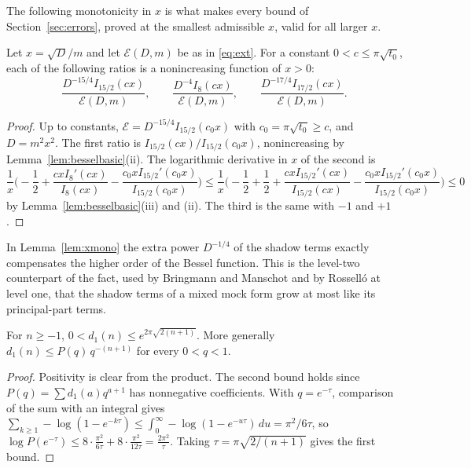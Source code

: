 The following monotonicity in $x$ is what makes every bound of Section~\ref{sec:errors}, proved at the smallest admissible $x$, valid for all larger $x$.

\begin{lemma}\label{lem:xmono}
Let $x=\sqrt D/m$ and let $\mathcal E(D,m)$ be as in \eqref{eq:ext}. For a constant $0<c\le\pi\sqrt{t_0}$, each of the following ratios is a nonincreasing function of $x>0$:
\[
\frac{D^{-15/4}I_{15/2}(cx)}{\mathcal E(D,m)},\qquad\frac{D^{-4}I_8(cx)}{\mathcal E(D,m)},\qquad\frac{D^{-17/4}I_{17/2}(cx)}{\mathcal E(D,m)}.
\]
\end{lemma}

\begin{proof}
Up to constants, $\mathcal E=D^{-15/4}I_{15/2}(c_0x)$ with $c_0=\pi\sqrt{t_0}\ge c$, and $D=m^2x^2$. The first ratio is $I_{15/2}(cx)/I_{15/2}(c_0x)$, nonincreasing by Lemma~\ref{lem:besselbasic}(ii). The logarithmic derivative in $x$ of the second is
\[
\frac1x\Big(-\frac12+\frac{cxI_8'(cx)}{I_8(cx)}-\frac{c_0xI_{15/2}'(c_0x)}{I_{15/2}(c_0x)}\Big)\le\frac1x\Big(-\frac12+\frac12+\frac{cxI_{15/2}'(cx)}{I_{15/2}(cx)}-\frac{c_0xI_{15/2}'(c_0x)}{I_{15/2}(c_0x)}\Big)\le0
\]
by Lemma~\ref{lem:besselbasic}(iii) and (ii). The third is the same with $-1$ and $+1$.
\end{proof}

\begin{remark}
In Lemma~\ref{lem:xmono} the extra power $D^{-1/4}$ of the shadow terms exactly compensates the higher order of the Bessel function. This is the level-two counterpart of the fact, used by Bringmann and Manschot \cite{BMa13} and by Rossell\'o at level one, that the shadow terms of a mixed mock form grow at most like its principal-part terms.
\end{remark}

\begin{lemma}\label{lem:d1bound}
For $n\ge-1$, $0<d_1(n)\le e^{2\pi\sqrt{2(n+1)}}$. More generally $d_1(n)\le P(q)\,q^{-(n+1)}$ for every $0<q<1$.
\end{lemma}

\begin{proof}
Positivity is clear from the product. The second bound holds since $P(q)=\sum d_1(a)q^{a+1}$ has nonnegative coefficients. With $q=e^{-\tau}$, comparison of the sum with an integral gives $\sum_{k\ge1}-\log(1-e^{-k\tau})\le\int_0^\infty-\log(1-e^{-u\tau})\,du=\pi^2/6\tau$, so $\log P(e^{-\tau})\le8\cdot\frac{\pi^2}{6\tau}+8\cdot\frac{\pi^2}{12\tau}=\frac{2\pi^2}\tau$. Taking $\tau=\pi\sqrt{2/(n+1)}$ gives the first bound.
\end{proof}
